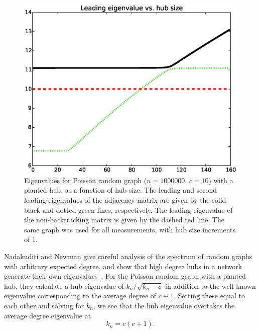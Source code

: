 \documentclass[twocolumn,prl,superscriptaddress]{revtex4}
\newcommand\colora{black }
\newcommand\colorb{red }
\newcommand\colorc{green }
\begin{document}
\begin{figure}
\begin{center}
\includegraphics[width=\columnwidth]{eig.eps}
\end{center}
\caption{Eigenvalues for Poisson random graph ($n=1000000$, $c=10$) with a planted hub, as a function of hub size. The leading and second leading eigenvalues of the adjacency matrix are given by the solid \colora and dotted \colorc lines, respectively. The leading eigenvalue of the non-backtracking matrix is given by the dashed \colorb line. The same graph was used for all measurements, with hub size increments of 1.}
\label{fig:evalues}
\end{figure}
Nadakuditi and Newman give careful analysis of the spectrum of random graphs with arbitrary expected degree, and show that high degree hubs in a network generate their own eigenvalues~\cite{nadakuditi13}. For the Poisson random graph with a planted hub, they calculate a hub eigenvalue of $k_n / \sqrt{k_n - c}$ in addition to the well known eigenvalue corresponding to the average degree of $c+1$. Setting these equal to each other and solving for $k_n$, we see that the hub eigenvalue overtakes the average degree eigenvalue at
\begin{equation}
k_n = c(c+1).
\label{eqn:crossover}
\end{equation}
\end{document}

